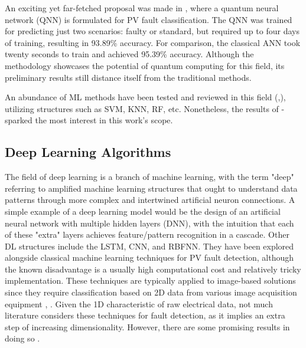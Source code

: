 An exciting yet far-fetched proposal was made in \cite{Uehara2021}, where a quantum neural network (QNN) is formulated for PV fault classification. The QNN was trained for predicting just two scenarios: faulty or standard, but required up to four days of training, resulting in 93.89\% accuracy. For comparison, the classical ANN took twenty seconds to train and achieved 95.39\% accuracy. Although the methodology showcases the potential of quantum computing for this field, its preliminary results still distance itself from the traditional methods.

An abundance of ML methods have been tested and reviewed in this field (\cite{Hong2022},\cite{Livera2019}), utilizing structures such as SVM, KNN, RF, etc. Nonetheless, the results of \cite{Rao2021}-\cite{Kilic2020} sparked the most interest in this work's scope.

\subsection{Deep Learning Algorithms}

The field of deep learning is a branch of machine learning, with the term "deep" referring to amplified machine learning structures that ought to understand data patterns through more complex and intertwined artificial neuron connections. A simple example of a deep learning model would be the design of an artificial neural network with multiple hidden layers (DNN), with the intuition that each of these "extra" layers achieves feature/pattern recognition in a cascade. Other DL structures include the LSTM, CNN, and RBFNN. They have been explored alongside classical machine learning techniques for PV fault detection, although the known disadvantage is a usually high computational cost and relatively tricky implementation. These techniques are typically applied to image-based solutions \cite{termoreview} since they require classification based on 2D data from various image acquisition equipment \cite{termo}, \cite{dlpv}. Given the 1D characteristic of raw electrical data, not much literature considers these techniques for fault detection, as it implies an extra step of increasing dimensionality. However, there are some promising results in doing so \cite{Aziz2020}.

